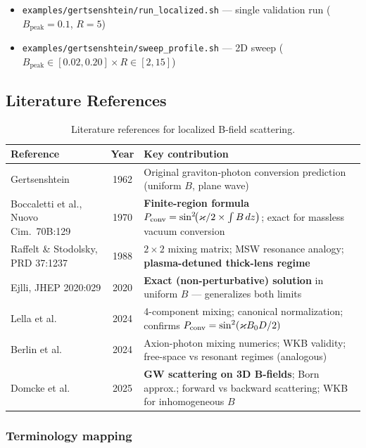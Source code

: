 \begin{itemize}
  \item \texttt{examples/gertsenshtein/run\_localized.sh} --- single validation run ($B_\text{peak}=0.1$, $R=5$)
  \item \texttt{examples/gertsenshtein/sweep\_profile.sh} --- 2D sweep ($B_\text{peak} \in [0.02,0.20] \times R \in [2,15]$)
\end{itemize}


\subsection{Literature References}
\label{sec:localized-literature}

\begin{table}[htbp]
\centering
\caption{Literature references for localized B-field scattering.}
\label{tab:localized-literature}
\begin{tabular}{@{}lcp{7cm}@{}}
\toprule
Reference & Year & Key contribution \\
\midrule
Gertsenshtein~\cite{gertsenshtein1962wave} & 1962 & Original graviton-photon conversion prediction (uniform $B$, plane wave) \\
Boccaletti et al., Nuovo Cim.\ 70B:129 & 1970 & \textbf{Finite-region formula} $P_\mathrm{conv} = \sin^2\!\bigl(\varkappa/2 \times \int B\, dz\bigr)$; exact for massless vacuum conversion \\
Raffelt \& Stodolsky, PRD 37:1237 & 1988 & $2\times 2$ mixing matrix; MSW resonance analogy; \textbf{plasma-detuned thick-lens regime} \\
Ejlli, JHEP 2020:029 & 2020 & \textbf{Exact (non-perturbative) solution} in uniform $B$ --- generalizes both limits \\
Lella et al.~\cite{lella2024constraining} & 2024 & 4-component mixing; canonical normalization; confirms $P_\mathrm{conv} = \sin^2(\varkappa B_0 D/2)$ \\
Berlin et al.~\cite{berlin2024axionphoton} & 2024 & Axion-photon mixing numerics; WKB validity; free-space vs resonant regimes (analogous) \\
Domcke et al.~\cite{domcke2025scattering} & 2025 & \textbf{GW scattering on 3D B-fields}; Born approx.; forward vs backward scattering; WKB for inhomogeneous $B$ \\
\bottomrule
\end{tabular}
\end{table}

\subsubsection{Terminology mapping}
\label{sec:terminology}

